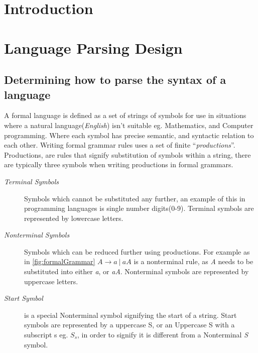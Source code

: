 
\section{Introduction}

\newpage
\section{Language Parsing Design}

\subsection{Determining how to parse the syntax of a language}

A formal language is defined as a set of strings of symbols for use in situations where a natural language(\emph{English}) isn't suitable eg. Mathematics, and Computer programming. Where each symbol has precise semantic, and syntactic relation to each other. Writing formal grammar rules uses a set of finite ``\emph{productions}''. Productions, are rules that signify substitution of symbols within a string, there are typically three symbols when writing productions in formal grammars.

\begin{description}
    \item[\emph{Terminal Symbols}] Symbols which cannot be substituted any further, an example of this in programming languages is single number digits(0-9). Terminal symbols are represented by lowercase letters.
    
    \item[\emph{Nonterminal Symbols}] Symbols which can be reduced further using productions. For example as in \ref{fig:formalGrammar} $A \rightarrow a\ |\ aA$ is a nonterminal rule, as \emph{A} needs to be substituted into either \emph{a}, or \emph{aA}. Nonterminal symbols are represented by uppercase letters.

    \item[\emph{Start Symbol}] is a special Nonterminal symbol signifying the start of a string. Start symbols are represented by a uppercase S, or an Uppercase S with a subscript s eg. $S_s$, in order to signify it is different from a Nonterminal \emph{S} symbol.
\end{description}


